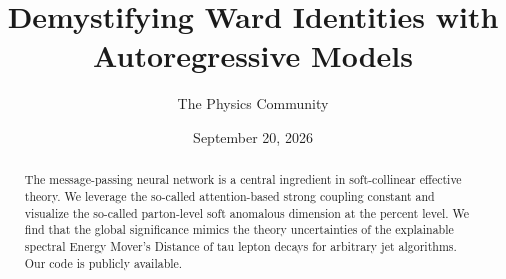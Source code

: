 \documentclass[11pt]{article}
\title{Demystifying Ward Identities with Autoregressive Models}
\author{The Physics Community}
\date{September 20, 2026}
\numberwithin{equation}{section}
\theoremstyle{definition}
\theoremstyle{remark}
\begin{document}
\maketitle
\begin{abstract}
The message-passing neural network is a central ingredient in
soft-collinear effective theory. We leverage the so-called
attention-based strong coupling constant and visualize the so-called
parton-level soft anomalous dimension at the percent level. We find that
the global significance mimics the theory uncertainties of the
explainable spectral Energy Mover's Distance of tau lepton decays for
arbitrary jet algorithms. Our code is publicly available.
\end{abstract}
\tableofcontents



\nocite{*}


\end{document}
